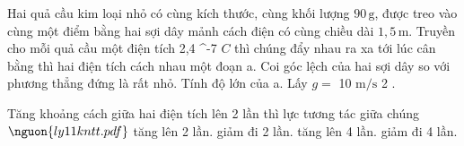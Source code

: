 \begin{bt}
Hai quả cầu kim loại nhỏ có cùng kích thước, cùng khối lượng $90\,\mathrm{g}$, được treo vào cùng một điểm bằng hai sợi dây mảnh cách điện có cùng chiều dài $1,5\,\text{m}$. Truyền cho mỗi quả cầu một điện tích 2,4 ^{-7} $C$ thì chúng đẩy nhau ra xa tới lúc cân bằng thì hai điện tích cách nhau một đoạn a. Coi góc lệch của hai sợi dây so với phương thẳng đứng là rất nhỏ. Tính độ lớn của a. Lấy $g =$ 10 $\mathrm{m/s}$ 2 $.$ 
\end{bt}

\begin{ex}
Tăng khoảng cách giữa hai điện tích lên 2 lần thì lực tương tác giữa chúng $\nguon{ly11 kntt.pdf}$
\choice
{tăng lên 2 lần.}
{giảm đi 2 lần.}
{tăng lên 4 lần.}
{\True giảm đi 4 lần.}
\end{ex}

